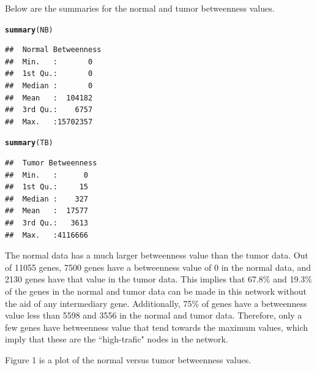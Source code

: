 \documentclass{article}\usepackage[]{graphicx}\usepackage[]{color}
\makeatletter
\newcommand{\hlstd}[1]{\textcolor[rgb]{0.345,0.345,0.345}{#1}}%
\newcommand{\hlkwd}[1]{\textcolor[rgb]{0.737,0.353,0.396}{\textbf{#1}}}%
\newenvironment{kframe}{%
 \def\at@end@of@kframe{}%
 \ifinner\ifhmode%
  \def\at@end@of@kframe{\end{minipage}}%
  \begin{minipage}{\columnwidth}%
 \fi\fi%
 \def\FrameCommand##1{\hskip\@totalleftmargin \hskip-\fboxsep
 \colorbox{shadecolor}{##1}\hskip-\fboxsep
     \hskip-\linewidth \hskip-\@totalleftmargin \hskip\columnwidth}%
 \MakeFramed {\advance\hsize-\width
   \@totalleftmargin\z@ \linewidth\hsize
   \@setminipage}}%
 {\par\unskip\endMakeFramed%
 \at@end@of@kframe}
\newenvironment{knitrout}{}{} %
\makeatother
\begin{document}
Below are the summaries for the normal and tumor betweenness values.
\begin{knitrout}\small
{}\color{fgcolor}\begin{kframe}
\begin{alltt}
\hlkwd{summary}\hlstd{(NB)}
\end{alltt}
\begin{verbatim}
##  Normal Betweenness
##  Min.   :       0  
##  1st Qu.:       0  
##  Median :       0  
##  Mean   :  104182  
##  3rd Qu.:    6757  
##  Max.   :15702357
\end{verbatim}
\begin{alltt}
\hlkwd{summary}\hlstd{(TB)}
\end{alltt}
\begin{verbatim}
##  Tumor Betweenness
##  Min.   :      0  
##  1st Qu.:     15  
##  Median :    327  
##  Mean   :  17577  
##  3rd Qu.:   3613  
##  Max.   :4116666
\end{verbatim}
\end{kframe}
\end{knitrout}
The normal data has a much larger betweenness value than the tumor data. Out of 11055 genes, 7500 genes have a betweenness value of 0 in the normal data, and 2130 genes have that value in the tumor data. This implies that 67.8$\%$ and 19.3$\%$ of the genes in the normal and tumor data can be made in this network without the aid of any intermediary gene. Additionally, 75$\%$ of genes have a betweenness value less than 5598 and 3556 in the normal and tumor data. Therefore, only a few genes have betweenness value that tend towards the maximum values, which imply that these are the ``high-trafic" nodes in the network.


Figure 1 is a plot of the normal versus tumor betweenness values.
\end{document}

